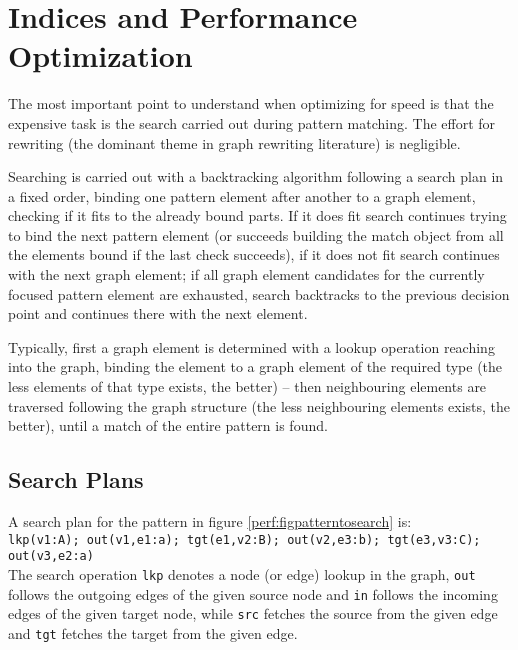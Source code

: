 \chapter{Indices and Performance Optimization}\label{cha:performance} 

The most important point to understand when optimizing for speed is that the expensive task is the search carried out during pattern matching. The effort for rewriting (the dominant theme in graph rewriting literature) is negligible.

Searching is carried out with a backtracking algorithm following a search plan in a fixed order, 
binding one pattern element after another to a graph element, checking if it fits to the already bound parts.
If it does fit search continues trying to bind the next pattern element (or succeeds building the match object from all the elements bound if the last check succeeds), if it does not fit search continues with the next graph element; if all graph element candidates for the currently focused pattern element are exhausted, search backtracks to the previous decision point and continues there with the next element.

Typically, first a graph element is determined with a lookup operation reaching into the graph, binding the element to a graph element of the required type (the less elements of that type exists, the better) -- then neighbouring elements are traversed following the graph structure (the less neighbouring elements exists, the better), until a match of the entire pattern is found.


\section{Search Plans}

A search plan for the pattern in figure \ref{perf:figpatterntosearch} is:\\
\texttt{lkp(v1:A); out(v1,e1:a); tgt(e1,v2:B); out(v2,e3:b); tgt(e3,v3:C); out(v3,e2:a)}\\
The search operation \texttt{lkp} denotes a node (or edge) lookup in the graph, \texttt{out} follows the outgoing edges of the given source node and \texttt{in} follows the incoming edges of the given target node, while \texttt{src} fetches the source from the given edge and \texttt{tgt} fetches the target from the given edge.

